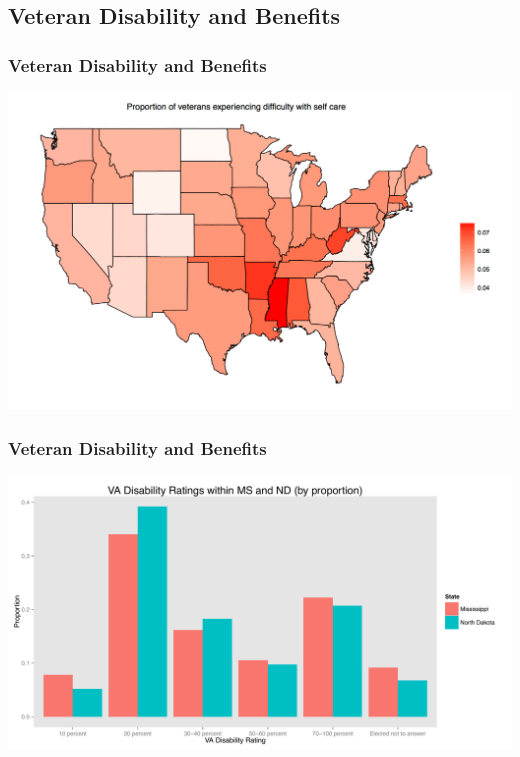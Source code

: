 \documentclass{beamer}
\begin{document}
\subsection{Veteran Disability and Benefits}
\begin{frame}
\frametitle{Veteran Disability and Benefits}
\begin{center} 
\includegraphics[width=1 \textwidth]{EthanVet}

\end{center}


\end{frame}

\begin{frame}
\frametitle{Veteran Disability and Benefits}
\begin{center} 
\includegraphics[width=1 \textwidth]{EthanPropPlot}

\end{center}


\end{frame}
\end{document}

